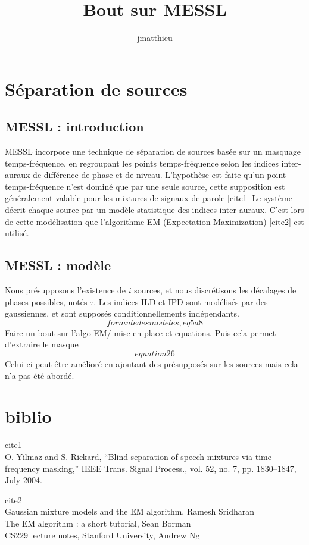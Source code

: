 \documentclass[a4paper,12pt,twocols]{article}
\title{Bout sur MESSL}
\author{jmatthieu}
\begin{document}
\maketitle

\section{Séparation de sources}

\subsection{MESSL : introduction}
MESSL incorpore une technique de séparation de sources basée sur un masquage temps-fréquence, en regroupant les points temps-fréquence selon les indices inter-auraux de différence de phase et de niveau. L'hypothèse est faite qu'un point temps-fréquence n'est dominé que par une seule source, cette supposition est généralement valable pour les mixtures de signaux de parole [cite1] Le système décrit chaque source par un modèle statistique des indices inter-auraux. C'est lors de cette modélisation que l'algorithme EM (Expectation-Maximization) [cite2] est utilisé.
\subsection{MESSL : modèle}
Nous présupposons l'existence de $i$ sources, et nous discrétisons les décalages de phases possibles, notés $\tau$. Les indices ILD et IPD sont modélisés par des gaussiennes, et sont supposés conditionnellements indépendants.
$$ formule des modeles,eq5a8$$
Faire un bout sur l'algo EM/ mise en place et equations.
Puis cela permet d'extraire le masque
$$equation26$$
Celui ci peut être amélioré en ajoutant des présupposés sur les sources mais cela n'a pas été abordé.

\section{biblio}
cite1 \\ O. Yilmaz and S. Rickard, “Blind separation of speech mixtures via
time-frequency masking,” IEEE Trans. Signal Process., vol. 52, no. 7,
pp. 1830–1847, July 2004.


cite2 \\
Gaussian mixture models and the EM algorithm, Ramesh Sridharan\\
The EM algorithm : a short tutorial, Sean Borman\\
CS229 lecture notes, Stanford University, Andrew Ng\\
\end{document}
